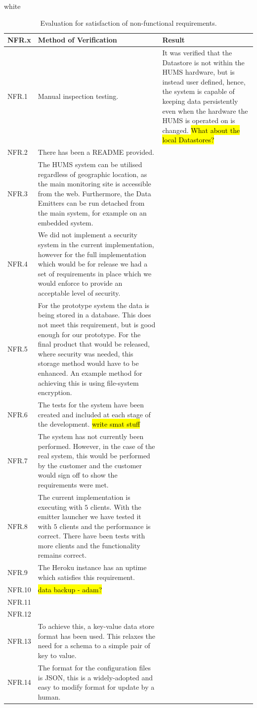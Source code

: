 \documentclass[10pt,a4paper]{article}
\newcommand{\tableformat}[4]{
\begin{table}[ht!]
\centering
  \rowcolors{2}{gray!10} {white}
\def\arraystretch{1.5}
\begin{tabularx}{\textwidth}{#1}
  \hline
  \rowcolor[gray]{0.9} #2
  \hline
\end{tabularx}
\caption{#3}
\label{#4}
\end{table}}
\begin{document}
\tableformat{ p{1.3cm} X X }{
	NFR.x  & 	Method of Verification & Result \\ \hline
	NFR.1  & Manual inspection testing. & It was verified that the Datastore is not within the HUMS hardware, but is instead user defined, hence, the system is capable of keeping data persistently even when the hardware the HUMS is operated on is changed. \hl{What about the local Datastores?} \\ 
	NFR.2  &There has been a README provided. 	  & 	 \\ 
	NFR.3  & 	The HUMS system can be utilised regardless of geographic location, as the main monitoring site is accessible from the web. Furthermore, the Data Emitters can be run detached from the main system, for example on an embedded system. 	  & 	 \\ 
	NFR.4  &We did not implement a security system in the current implementation, however for the full implementation which would be for release we had a set of requirements in place which we would enforce to provide an acceptable level of security. 	  & 	\\ 
	NFR.5  & For the prototype system the data is being stored in a database. This does not meet this requirement, but is good enough for our prototype. For the final product that would be released, where security was needed, this storage method would have to be enhanced. An example method for achieving this is using file-system encryption. & \\
	NFR.6  &The tests for the system have been created and included at each stage of the development. \hl{write smat stuff} 	  & 	\\
	NFR.7  &The system has not currently been performed. However, in the case of the real system, this would be performed by the customer and the customer would sign off to show the requirements were met. 	  & 	 \\
	NFR.8  &The current implementation is executing with $5$ clients. With the emitter launcher we have tested it with $5$ clients and the performance is correct. There have been tests with more clients and the functionality remains correct.	  & 	 \\ 
	NFR.9  & The Heroku instance has an uptime which satisfies this requirement.	  & 	 \\ 
	NFR.10  & \hl{data backup - adam?}	  & 	 \\ 
	NFR.11  & 	  & 	 \\ 
	NFR.12  & 	  & 	 \\ 
	NFR.13  & 	To achieve this, a key-value data store format has been used. This relaxes the need for a schema to a simple pair of key to value.  & 	 \\
	NFR.14  & 	The format for the configuration files is JSON, this is a widely-adopted and easy to modify format for update by a human.  & 	 \\
}{Evaluation for satisfaction of non-functional requirements.}{nfrevaltable} %
\end{document}
